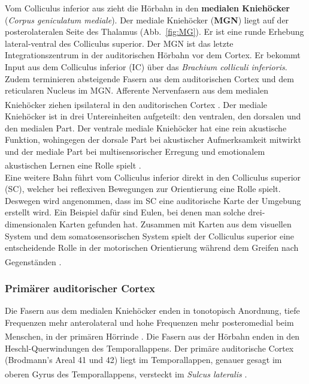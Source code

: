 \documentclass[12pt,a4paper,pdftex]{article}
\begin{document}
Vom Colliculus inferior aus zieht die Hörbahn in den \textbf{medialen Kniehöcker} (\textit{Corpus geniculatum mediale}).  Der mediale Kniehöcker (\textbf{MGN}) liegt auf der posterolateralen Seite des Thalamus (Abb.~\ref{fig:MG}). Er ist eine runde Erhebung lateral-ventral des Colliculus superior. Der MGN ist das letzte Integrationszentrum in der auditorischen Hörbahn vor dem Cortex. Er bekommt Input aus dem Colliculus inferior (IC) über das \textit{Brachium colliculi inferioris}. Zudem terminieren absteigende Fasern aus dem auditorischen Cortex und dem reticularen Nucleus im MGN. Afferente Nervenfasern aus dem medialen Kniehöcker ziehen ipsilateral in den auditorischen Cortex \textsuperscript{\cite[29]{paxinos2014rat}}. Der mediale Kniehöcker ist in drei Untereinheiten aufgeteilt: den ventralen, den dorsalen und den medialen Part. Der ventrale mediale Kniehöcker hat eine rein akustische Funktion, wohingegen der dorsale Part bei akustischer Aufmerksamkeit mitwirkt und der mediale Part bei multisensorischer Erregung und emotionalem akustischen Lernen eine Rolle spielt \textsuperscript{\cite[29]{paxinos2014rat}}. 
\\
Eine weitere Bahn führt vom Colliculus inferior direkt in den Colliculus superior (SC), welcher bei reflexiven Bewegungen zur Orientierung eine Rolle spielt. Deswegen wird angenommen, dass im SC eine auditorische Karte der Umgebung erstellt wird. Ein Beispiel dafür sind Eulen, bei denen man solche drei-dimensionalen Karten gefunden hat. Zusammen mit Karten aus dem visuellen System und dem somatosensorischen System spielt der Colliculus superior eine entscheidende Rolle in der motorischen Orientierung während dem Greifen nach Gegenständen \textsuperscript{\cite[31]{kandel2013principles}}.


\subsubsection*{Primärer auditorischer Cortex}

Die Fasern aus dem medialen Kniehöcker enden in tonotopisch Anordnung, tiefe Frequenzen mehr anterolateral und hohe Frequenzen mehr posteromedial beim Menschen, in der primären Hörrinde \textsuperscript{\cite[9.9]{trepel2011neuroanatomie}}. Die Fasern aus der Hörbahn enden in den Heschl-Querwindungen des Temporallappens. Der primäre auditorische Cortex (Brodmann's Areal 41 und 42) liegt im Temporallappen, genauer gesagt im oberen Gyrus des Temporallappens, versteckt im \textit{Sulcus lateralis}  \textsuperscript{\cite[13]{crossman2014neuroanatomy}}. 
\end{document}
